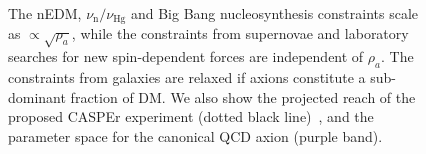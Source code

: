 \begin{figure}
{  The nEDM, {\color{black}$\nu_\mathrm{n} / \nu_\textrm{Hg}$} and Big Bang nucleosynthesis constraints scale as $\propto \sqrt{\rho_a}$, while the constraints from supernovae {\color{black}and laboratory searches for new spin-dependent forces} are independent of $\rho_a$.
  The constraints from galaxies are relaxed if axions constitute a sub-dominant fraction of DM.
  We also show the projected reach of the proposed CASPEr experiment (dotted black line)~\cite{CASPEr2014}, and the parameter space for the canonical QCD axion (purple band).
}
\label{fig:axion_limits_v2}
\end{figure}

